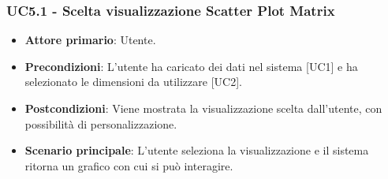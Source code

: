 \subsubsection{UC5.1 - Scelta visualizzazione Scatter Plot Matrix}
\begin{itemize}
	\item \textbf{Attore primario}: Utente.
	\item \textbf{Precondizioni}: L'utente ha caricato dei dati nel sistema [UC1] e ha selezionato le dimensioni da utilizzare [UC2].
	\item \textbf{Postcondizioni}: Viene mostrata la visualizzazione  scelta dall'utente, con possibilità di personalizzazione.
	\item \textbf{Scenario principale}: L'utente seleziona la visualizzazione  e il sistema ritorna un grafico con cui si può interagire.
\end{itemize}